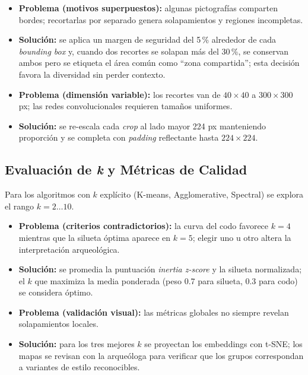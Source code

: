 \begin{itemize}
  \item \textbf{Problema (motivos superpuestos):} algunas pictografías comparten bordes; recortarlas por separado genera solapamientos y regiones incompletas.
  \item \textbf{Solución:} se aplica un margen de seguridad del 5\,\% alrededor de cada \emph{bounding box} y, cuando dos recortes se solapan más del 30\,\%, se conservan ambos pero se etiqueta el área común como “zona compartida”; esta decisión favora la diversidad sin perder contexto.

  \item \textbf{Problema (dimensión variable):} los recortes van de \(40\times40\) a \(300\times300\) px; las redes convolucionales requieren tamaños uniformes.
  \item \textbf{Solución:} se re-escala cada \emph{crop} al lado mayor 224 px manteniendo proporción y se completa con \textit{padding} reflectante hasta \(224\times224\).
\end{itemize}

\subsection{Evaluación de \emph{k} y Métricas de Calidad}\label{ssec:k_selection}

Para los algoritmos con \(k\) explícito (K-means, Agglomerative, Spectral) se explora el rango \(k=2\ldots10\).

\begin{itemize}
  \item \textbf{Problema (criterios contradictorios):} la curva del codo favorece \(k=4\) mientras que la silueta óptima aparece en \(k=5\); elegir uno u otro altera la interpretación arqueológica.
  \item \textbf{Solución:} se promedia la puntuación \emph{inertia z-score} y la silueta normalizada; el \(k\) que maximiza la media ponderada (peso 0.7 para silueta, 0.3 para codo) se considera óptimo.

  \item \textbf{Problema (validación visual):} las métricas globales no siempre revelan solapamientos locales.
  \item \textbf{Solución:} para los tres mejores \(k\) se proyectan los embeddings con t-SNE; los mapas se revisan con la arqueóloga para verificar que los grupos correspondan a variantes de estilo reconocibles.
\end{itemize}

